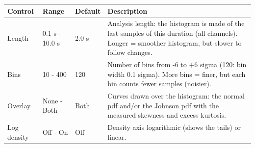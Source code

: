 \begin{tabular}{p{}p{}p{}p{}}
\hline
Control & Range & Default & Description \\
\hline
Length & 0.1 s - 10.0 s & 2.0 s & Analysis length: the histogram is made of the last samples of this duration (all channels). Longer = smoother histogram, but slower to follow changes. \\
Bins & 10 - 400 & 120 & Number of bins from -6 to +6 sigma (120: bin width 0.1 sigma). More bins = finer, but each bin counts fewer samples (noisier). \\
Overlay & None - Both & Both & Curves drawn over the histogram: the normal pdf and/or the Johnson pdf with the measured skewness and excess kurtosis. \\
Log density & Off - On & Off & Density axis logarithmic (shows the tails) or linear. \\
\hline
\end{tabular}
